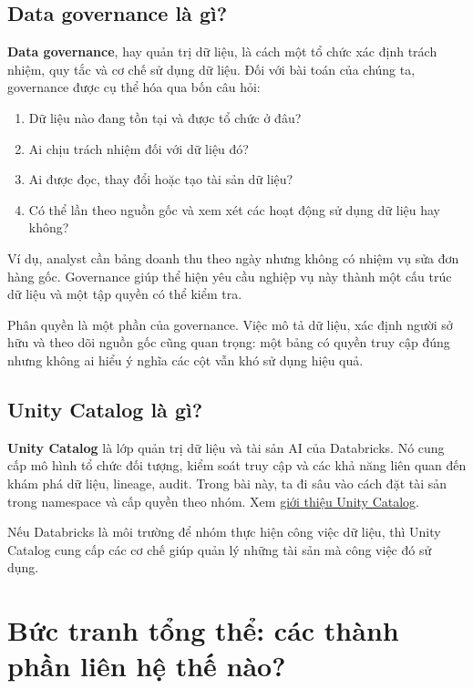 \FloatBarrier
{}
\subsection{Data governance là gì?}

\textbf{Data governance}, hay quản trị dữ liệu, là cách một tổ chức xác định trách nhiệm, quy tắc và cơ chế sử dụng dữ liệu. Đối với bài toán của chúng ta, governance được cụ thể hóa qua bốn câu hỏi:


\begin{enumerate}
\item Dữ liệu nào đang tồn tại và được tổ chức ở đâu?
\item Ai chịu trách nhiệm đối với dữ liệu đó?
\item Ai được đọc, thay đổi hoặc tạo tài sản dữ liệu?
\item Có thể lần theo nguồn gốc và xem xét các hoạt động sử dụng dữ liệu hay không?
\end{enumerate}

Ví dụ, analyst cần bảng doanh thu theo ngày nhưng không có nhiệm vụ sửa đơn hàng gốc. Governance giúp thể hiện yêu cầu nghiệp vụ này thành một cấu trúc dữ liệu và một tập quyền có thể kiểm tra.


Phân quyền là một phần của governance. Việc mô tả dữ liệu, xác định người sở hữu và theo dõi nguồn gốc cũng quan trọng: một bảng có quyền truy cập đúng nhưng không ai hiểu ý nghĩa các cột vẫn khó sử dụng hiệu quả.


\FloatBarrier
{}
\subsection{Unity Catalog là gì?}

\textbf{Unity Catalog} là lớp quản trị dữ liệu và tài sản AI của Databricks. Nó cung cấp mô hình tổ chức đối tượng, kiểm soát truy cập và các khả năng liên quan đến khám phá dữ liệu, lineage, audit. Trong bài này, ta đi sâu vào cách đặt tài sản trong namespace và cấp quyền theo nhóm. Xem \href{https://docs.databricks.com/aws/en/data-governance/unity-catalog/}{giới thiệu Unity Catalog}.


Nếu Databricks là môi trường để nhóm thực hiện công việc dữ liệu, thì Unity Catalog cung cấp các cơ chế giúp quản lý những tài sản mà công việc đó sử dụng.


\FloatBarrier
{}
\section{Bức tranh tổng thể: các thành phần liên hệ thế nào?}

